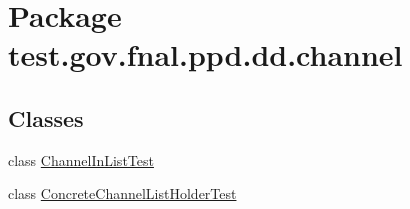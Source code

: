 \hypertarget{namespacetest_1_1gov_1_1fnal_1_1ppd_1_1dd_1_1channel}{\section{Package test.\-gov.\-fnal.\-ppd.\-dd.\-channel}
\label{namespacetest_1_1gov_1_1fnal_1_1ppd_1_1dd_1_1channel}
}
\subsection*{Classes}
\begin{DoxyCompactItemize}
\item 
class \hyperlink{classtest_1_1gov_1_1fnal_1_1ppd_1_1dd_1_1channel_1_1ChannelInListTest}{Channel\-In\-List\-Test}
\item 
class \hyperlink{classtest_1_1gov_1_1fnal_1_1ppd_1_1dd_1_1channel_1_1ConcreteChannelListHolderTest}{Concrete\-Channel\-List\-Holder\-Test}
\end{DoxyCompactItemize}
